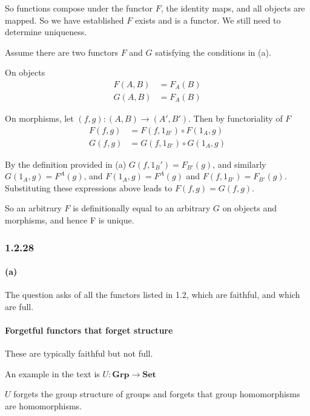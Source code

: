 \documentclass{article}
\begin{document}
So functions compose under the functor $F$, the identity maps, and all objects are mapped. So we have established $F$ exists and is a functor. We still need to determine uniqueness.

Assume there are two functors $F$ and $G$ satisfying the conditions in (a).

On objects
\begin{align*}
	F(A, B) &= F_A(B)\\
	G(A,B) &= F_A(B)
\end{align*}

	On morphisms, let $(f, g): (A, B) \rightarrow (A', B')$. Then by functoriality of $F$
\begin{align*}
	F(f, g) &= F(f, 1_{B'}) \circ F(1_A, g)\\
	G(f, g) & =G(f, 1_{B'}) \circ G(1_A, g)
\end{align*}

By the definition provided in (a) $G(f,1_B') = F_{B'}(g)$, and similarly $G(1_A, g) = F^A(g)$, and
	$F(1_A, g) = F^A(g)$ and $F(f, 1_{B'}) = F_{B'}(g)$. Substituting these expressions above leads to $F(f, g) = G(f, g)$.


So an arbitrary $F$ is definitionally equal to an arbitrary $G$ on objects and morphisms, and hence F is unique.

\subsubsection*{1.2.28}

\paragraph{(a)}

The question asks of all the functors listed in 1.2, which are faithful, and which are full.

\paragraph{Forgetful functors that forget structure}

These are typically faithful but not full.

An example in the text is $U\colon\textbf{Grp} \rightarrow \textbf{Set}$

$U$ forgets the group structure of groups and forgets that group homomorphisms are homomorphisms.
\end{document}
